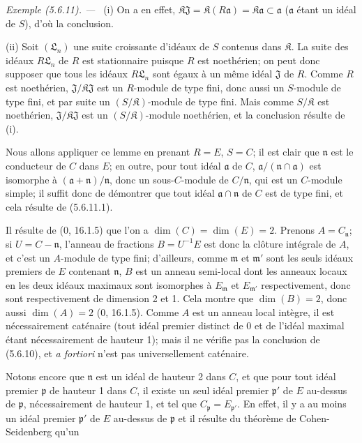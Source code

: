 \documentclass[10pt,oneside]{book}
\newenvironment{example}[1][]{%
  \par\medskip\noindent\textit{Exemple (#1). ---\ }}{\par}
\begin{document}
\begin{example}[5.6.11]
(i) On a en effet,
$\mathfrak K\mathfrak J=\mathfrak K(R\mathfrak a)
=\mathfrak K\mathfrak a\subset\mathfrak a$
($\mathfrak a$ étant un idéal de $S$), d'où la conclusion.

(ii) Soit $(\mathfrak L_n)$ une suite croissante d'idéaux de $S$ contenus
dans $\mathfrak K$. La suite des idéaux $R\mathfrak L_n$ de $R$ est
stationnaire puisque $R$ est noethérien; on peut donc supposer que tous les
idéaux $R\mathfrak L_n$ sont égaux à un même idéal $\mathfrak J$ de $R$.
Comme $R$ est noethérien, $\mathfrak J/\mathfrak K\mathfrak J$ est un
$R$-module de type fini, donc aussi un $S$-module de type fini, et par suite
un $(S/\mathfrak K)$-module de type fini. Mais comme $S/\mathfrak K$ est
noethérien, $\mathfrak J/\mathfrak K\mathfrak J$ est un
$(S/\mathfrak K)$-module noethérien, et la conclusion résulte de (i).

Nous allons appliquer ce lemme en prenant $R=E$, $S=C$; il est clair que
$\mathfrak n$ est le conducteur de $C$ dans $E$; en outre, pour tout idéal
$\mathfrak a$ de $C$,
$\mathfrak a/(\mathfrak n\cap\mathfrak a)$ est isomorphe à
$(\mathfrak a+\mathfrak n)/\mathfrak n$, donc un sous-$C$-module de
$C/\mathfrak n$, qui est un $C$-module simple; il suffit donc de démontrer
que tout idéal $\mathfrak a\cap\mathfrak n$ de $C$ est de type fini, et cela
résulte de (5.6.11.1).

Il résulte de (0, 16.1.5) que l'on a $\dim(C)=\dim(E)=2$. Prenons
$A=C_{\mathfrak n}$; si $U=C-\mathfrak n$, l'anneau de fractions
$B=U^{-1}E$ est donc la clôture intégrale de $A$, et c'est un $A$-module de
type fini; d'ailleurs, comme $\mathfrak m$ et $\mathfrak m'$ sont les seuls
idéaux premiers de $E$ contenant $\mathfrak n$, $B$ est un anneau semi-local
dont les anneaux locaux en les deux idéaux maximaux sont isomorphes à
$E_{\mathfrak m}$ et $E_{\mathfrak m'}$ respectivement, donc sont
respectivement de dimension 2 et 1. Cela montre que $\dim(B)=2$, donc aussi
$\dim(A)=2$ (0, 16.1.5). Comme $A$ est un anneau local intègre, il est
nécessairement caténaire (tout idéal premier distinct de 0 et de l'idéal
maximal étant nécessairement de hauteur 1); mais il ne vérifie pas la
conclusion de (5.6.10), et \emph{a fortiori} n'est pas universellement
caténaire.

Notons encore que $\mathfrak n$ est un idéal de hauteur 2 dans $C$, et que
pour tout idéal premier $\mathfrak p$ de hauteur 1 dans $C$, il existe un
seul idéal premier $\mathfrak p'$ de $E$ au-dessus de $\mathfrak p$,
nécessairement de hauteur 1, et tel que
$C_{\mathfrak p}=E_{\mathfrak p'}$. En effet, il y a au moins un idéal
premier $\mathfrak p'$ de $E$ au-dessus de $\mathfrak p$ et il résulte du
théorème de Cohen-Seidenberg qu'un


\end{example}
\end{document}
